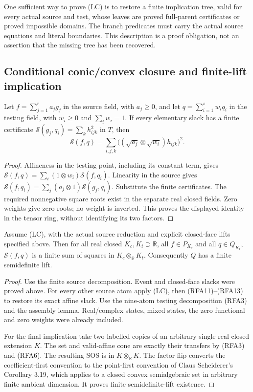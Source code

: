 One sufficient way to prove (LC) is to restore a finite implication
tree, valid for every actual source and test, whose leaves are
proved full-parent certificates or proved impossible domains.
The branch predicates must carry the actual source equations and
literal boundaries. This description is a proof obligation, not an
assertion that the missing tree has been recovered.

\subsection{Conditional conic/convex closure and finite-lift implication}

\begin{lemma}
Let $f=\sum_{j=1}^r a_jg_j$ in the source field, with $a_j\geq0$,
and let $q=\sum_{i=1}^s w_iq_i$ in the testing field, with
$w_i\geq0$ and $\sum_iw_i=1$. If every elementary slack has a
finite certificate
$\mathscr S(g_j,q_i)=\sum_kh_{ijk}^2$ in $T$, then
\[
 \mathscr S(f,q)=
 \sum_{i,j,k}\bigl((\sqrt{a_j}\otimes\sqrt{w_i})h_{ijk}\bigr)^2.
 \tag{RFA16}
\]
\end{lemma}
\begin{proof}
Affineness in the testing point, including its constant term, gives
$\mathscr S(f,q)=\sum_i(1\otimes w_i)\mathscr S(f,q_i)$.
Linearity in the source gives
$\mathscr S(f,q_i)=\sum_j(a_j\otimes1)\mathscr S(g_j,q_i)$.
Substitute the finite certificates. The required nonnegative square
roots exist in the separate real closed fields. Zero weights give
zero roots; no weight is inverted. This proves the displayed identity
in the tensor ring, without identifying its two factors.
\end{proof}

\begin{theorem}
Assume (LC), with the actual source reduction and explicit closed-face
lifts specified above. Then for all real closed $K_c,K_t\supset\mathbb R$,
all $f\in P_{K_c}$ and all $q\in Q_{K_t}$,
$\mathscr S(f,q)$ is a finite sum of squares in
$K_c\otimes_{\mathbb R}K_t$. Consequently $Q$ has a finite
semidefinite lift.
\end{theorem}
\begin{proof}
Use the finite source decomposition. Event and closed-face slacks
were proved above. For every other source atom apply (LC), then
(RFA11)--(RFA13) to restore its exact affine slack.
Use the nine-atom testing decomposition (RFA3) and the assembly
lemma. Real/complex states, mixed states, the zero functional and
zero weights were already included.

For the final implication take two labelled copies of an arbitrary
single real closed extension $K$. The set and valid-affine cone are
exactly their transfers by (RFA3) and (RFA6). The resulting SOS is
in $K\otimes_{\mathbb R}K$. The factor flip converts the
coefficient-first convention to the point-first convention of
Claus Scheiderer's Corollary 3.19, which applies to a closed convex
semialgebraic set in arbitrary finite ambient dimension. It proves
finite semidefinite-lift existence.
\end{proof}

